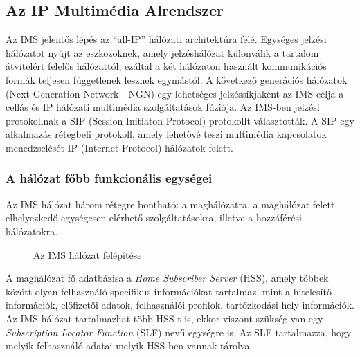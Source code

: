 \subsection{Az IP Multimédia Alrendszer}
\label{sec:ims}

Az IMS jelentős lépés az ``all-IP'' hálózati architektúra felé. Egységes jelzési hálózatot nyújt az eszközöknek, amely jelzéshálózat különválik a tartalom átvitelért felelős hálózattól, ezáltal a két hálózaton használt kommunikációs formák teljesen függetlenek lesznek egymástól. A következő generációs hálózatok (Next Generation Network - NGN) egy lehetséges jelzéssíkjaként az IMS célja a cellás és IP hálózati multimédia szolgáltatások fúziója. Az IMS-ben jelzési protokollnak a  SIP (Session Initiaton Protocol) protokollt választották. A SIP egy alkalmazás rétegbeli protokoll, amely lehetővé teszi multimédia kapcsolatok menedzselését IP (Internet Protocol) hálózatok felett. 

\subsubsection{A hálózat főbb funkcionális egységei}

Az IMS hálózat három rétegre bontható: a maghálózatra, a maghálózat felett elhelyezkedő egységesen elérhető szolgáltatásokra, illetve a hozzáférési hálózatokra.

\begin{figure}[htbp]
\center
{}
\caption{Az IMS hálózat felépítése~\cite{ims_figure} }
\label{fig:model}
\end{figure}


A maghálózat fő adatbázisa a \emph{Home Subscriber Server} (HSS), amely többek között olyan felhasználó-specifikus információkat tartalmaz, mint a hitelesítő információk, előfizetői adatok, felhasználói profilok, tartózkodási hely információk. Az IMS hálózat tartalmazhat több HSS-t is, ekkor viszont szükség van egy \emph{Subscription Locator Function} (SLF) nevű egységre is. Az SLF tartalmazza, hogy melyik felhasználó adatai melyik HSS-ben vannak tárolva.

